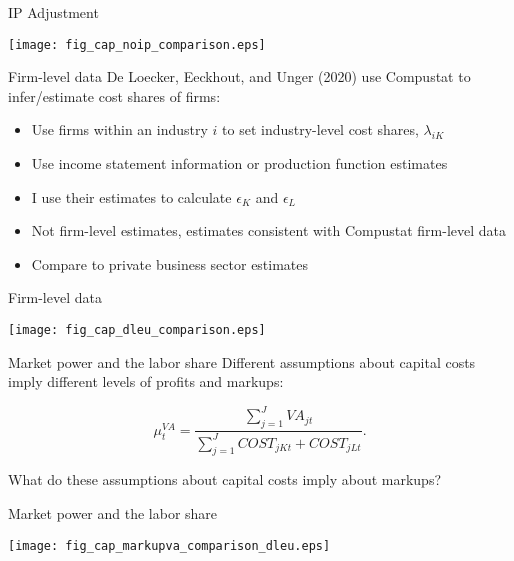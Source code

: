 \documentclass[10pt,xcolor=dvipsnames]{beamer}
\begin{document}
\begin{frame}{IP Adjustment}
\begin{center}
\texttt{[image: fig\_cap\_noip\_comparison.eps]}
\end{center}
\end{frame}


\begin{frame}{Firm-level data}\label{Sfirm}
De Loecker, Eeckhout, and Unger (2020) use Compustat to infer/estimate cost shares of firms: 

\begin{itemize}
  \item Use firms within an industry $i$ to set industry-level cost shares, $\lambda_{iK}$
  \item Use income statement information or production function estimates
  \item I use their estimates to calculate $\epsilon_K$ and $\epsilon_L$
  \item Not firm-level estimates, estimates consistent with Compustat firm-level data
  \item Compare to private business sector estimates
\end{itemize}

\vspace{.25in} \hfill \hyperlink{Afirm}{}
\end{frame}

\begin{frame}{Firm-level data}
\begin{center}
\texttt{[image: fig\_cap\_dleu\_comparison.eps]}
\end{center}
\end{frame}

\begin{frame}{Market power and the labor share}
Different assumptions about capital costs imply different levels of profits and markups:

\begin{equation}
    \mu^{VA}_{t} = \frac{\sum_{j=1}^{J} VA_{jt}}{\sum_{j=1}^J COST_{jKt} + COST_{jLt}}. \label{EQ_markup}
\end{equation}

What do these assumptions about capital costs imply about markups?

\end{frame}

\begin{frame}{Market power and the labor share}
\begin{center}
\texttt{[image: fig\_cap\_markupva\_comparison\_dleu.eps]}
\end{center}
\end{frame}
\end{document}
